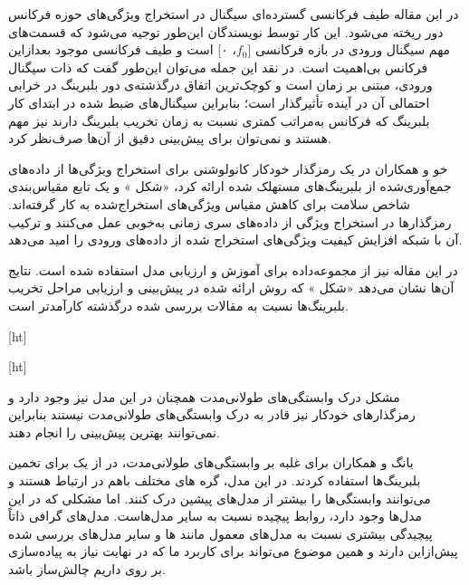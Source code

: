  در این مقاله طیف فرکانسی گسترده‌ای سیگنال در استخراج ویژگی‌های حوزه فرکانس دور ریخته می‌شود. این کار توسط نویسندگان این‌طور توجیه می‌شود که قسمت‌های مهم سیگنال ورودی در بازه فرکانسی [$f_0$، ۰] است و طیف فرکانسی موجود بعدازاین فرکانس بی‌اهمیت است. در نقد این جمله می‌توان این‌طور گفت که ذات سیگنال ورودی، مبتنی بر زمان است و کوچک‌ترین اتفاق درگذشته‌ی دور بلبرینگ در خرابی احتمالی آن در آینده تأثیرگذار است؛ بنابراین سیگنال‌های ضبط شده در ابتدای کار بلبرینگ که فرکانس به‌مراتب کمتری نسبت به زمان تخریب بلبرینگ دارند نیز مهم هستند و نمی‌توان برای پیش‌بینی دقیق از آن‌ها صرف‌نظر کرد.




خو و همکاران در  یک رمزگذار خودکار کانولوشنی برای استخراج ویژگی‌ها از داده‌های جمع‌آوری‌شده از بلبرینگ‌های مستهلک شده ارائه کرد، «شکل » و یک تابع مقیاس‌بندی شاخص سلامت برای کاهش مقیاس ویژگی‌های استخراج‌شده به کار گرفته‌اند. رمزگذارها در استخراج ویژگی از داده‌های سری زمانی به‌خوبی عمل می‌کنند و ترکیب آن با شبکه  افزایش کیفیت ویژگی‌های استخراج شده از داده‌های ورودی را امید می‌دهد.

در این مقاله نیز از مجموعه‌داده  برای آموزش و ارزیابی مدل استفاده شده است. نتایج آن‌ها نشان می‌دهد «شکل » که روش ارائه شده در پیش‌بینی  و ارزیابی مراحل تخریب بلبرینگ‌ها نسبت به مقالات بررسی شده درگذشته کارآمدتر است. 


[ht]



[ht]

مشکل درک وابستگی‌های طولانی‌مدت همچنان در این مدل نیز وجود دارد و رمزگذارهای خودکار نیز قادر به درک وابستگی‌های طولانی‌مدت نیستند بنابراین نمی‌توانند بهترین پیش‌بینی را انجام دهند.



یانگ و همکاران برای غلبه بر وابستگی‌های طولانی‌مدت، در  از یک  برای تخمین  بلبرینگ‌ها استفاده کردند. در این مدل، گره های مختلف باهم در ارتباط هستند و می‌توانند وابستگی‌ها را بیشتر از مدل‌های پیشین درک کنند. اما مشکلی که در این مدل‌ها وجود دارد، روابط پیچیده نسبت به سایر مدل‌هاست. مدل‌های گرافی ذاتاً پیچیدگی بیشتری نسبت به مدل‌های معمول مانند  ها و سایر مدل‌های بررسی شده پیش‌ازاین دارند و همین موضوع می‌تواند برای کاربرد ما که در نهایت نیاز به پیاده‌سازی بر روی  داریم چالش‌ساز باشد.


